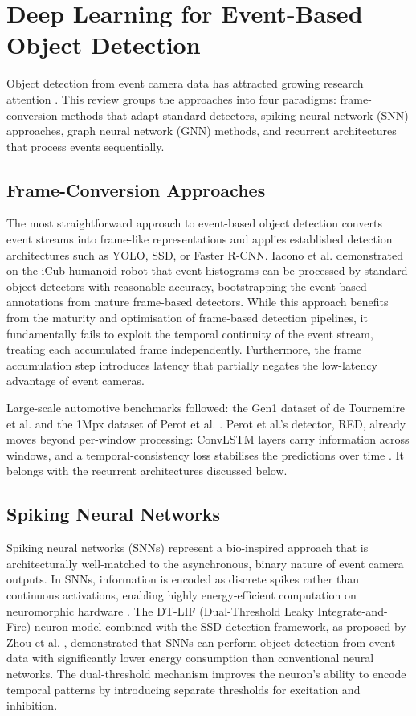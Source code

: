 \documentclass[11pt, a4paper]{report}
\begin{document}
\section{Deep Learning for Event-Based Object Detection}
Object detection from event camera data has attracted growing research attention \cite{zheng2023deep}. This review groups the approaches into four paradigms: frame-conversion methods that adapt standard detectors, spiking neural network (SNN) approaches, graph neural network (GNN) methods, and recurrent architectures that process events sequentially. 

\subsection{Frame-Conversion Approaches}
The most straightforward approach to event-based object detection converts event streams into frame-like representations and applies established detection architectures such as YOLO, SSD, or Faster R-CNN. Iacono et al. \cite{iacono2018towards} demonstrated on the iCub humanoid robot that event histograms can be processed by standard object detectors with reasonable accuracy, bootstrapping the event-based annotations from mature frame-based detectors. While this approach benefits from the maturity and optimisation of frame-based detection pipelines, it fundamentally fails to exploit the temporal continuity of the event stream, treating each accumulated frame independently. Furthermore, the frame accumulation step introduces latency that partially negates the low-latency advantage of event cameras. 

Large-scale automotive benchmarks followed: the Gen1 dataset of de Tournemire et al. \cite{detournemire2020large} and the 1Mpx dataset of Perot et al. \cite{perot2020learning}. Perot et al.'s detector, RED, already moves beyond per-window processing: ConvLSTM layers carry information across windows, and a temporal-consistency loss stabilises the predictions over time \cite{perot2020learning}. It belongs with the recurrent architectures discussed below.

\subsection{Spiking Neural Networks}
Spiking neural networks (SNNs) represent a bio-inspired approach that is architecturally well-matched to the asynchronous, binary nature of event camera outputs. In SNNs, information is encoded as discrete spikes rather than continuous activations, enabling highly energy-efficient computation on neuromorphic hardware \cite{roy2019towards}. The DT-LIF (Dual-Threshold Leaky Integrate-and-Fire) neuron model combined with the SSD detection framework, as proposed by Zhou et al. \cite{zhou2023dtlif}, demonstrated that SNNs can perform object detection from event data with significantly lower energy consumption than conventional neural networks. The dual-threshold mechanism improves the neuron's ability to encode temporal patterns by introducing separate thresholds for excitation and inhibition. 
\end{document}
